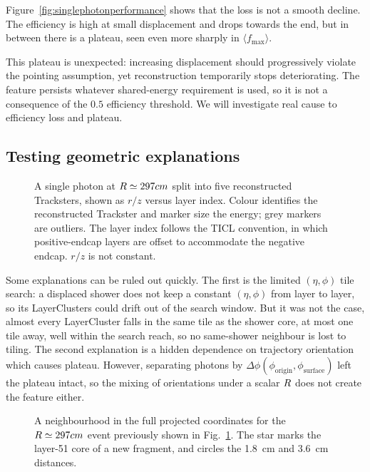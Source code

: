 Figure~\ref{fig:singlephotonperformance} shows that the loss is not a smooth
decline. The efficiency is high at small displacement and drops towards
the end, but in between there is a plateau, seen even more sharply in $\langle f_{\max}\rangle$.

This plateau is unexpected: increasing displacement should progressively
violate the pointing assumption, yet reconstruction temporarily stops
deteriorating. The feature persists whatever
shared-energy requirement is used, so it is not a consequence of the $0.5$
efficiency threshold. We will investigate real cause to efficiency loss and plateau.

\subsection{Testing geometric explanations}

\begin{figure}[!tp]
  \centering
  \caption{A single photon at $R\simeq297 cm$ split into five
  reconstructed Tracksters, shown as $r/z$ versus layer index. Colour identifies
  the reconstructed Trackster and marker size the energy; grey markers are
  outliers. The layer index follows the TICL convention, in which positive-endcap
  layers are offset to accommodate the negative endcap. $r/z$ is not constant.}
  \label{fig:singlephotonsplit}
\end{figure}

Some explanations can be ruled out quickly. The first is the limited
$(\eta,\phi)$ tile search: a displaced shower does not keep a constant
$(\eta,\phi)$ from layer to layer, so its LayerClusters could drift out of the
search window. But it was not the case, almost every LayerCluster
falls in the same tile as the shower core, at most one tile away, well within
the search reach, so no same-shower neighbour is lost to tiling. The
second explanation is a hidden dependence on trajectory orientation which causes plateau. However, separating photons by
$\Delta\phi(\phi_{\text{origin}}, \phi_{\text{surface}})$ left the plateau
intact, so the mixing of orientations under a
scalar $R$ does not create the feature either.

\begin{figure}[!tp]
  \centering
  \caption{A neighbourhood in the full projected coordinates for the
  $R\simeq297 cm$ event previously shown in
  Fig.~\ref{fig:singlephotonsplit}. The star marks the layer-51 core of a new
  fragment, and circles the \SI{1.8}{cm} and \SI{3.6}{cm} distances.}
  \label{fig:singlephotonneighbourhood}
\end{figure}

